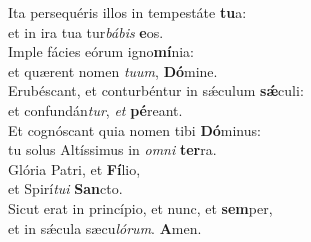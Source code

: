 \evenverse Ita persequéris illos in tempestáte \textbf{tu}a:~\*\\
\evenverse et in ira tua tur\textit{bá}\textit{bis} \textbf{e}os.\\
\oddverse Imple fácies eórum igno\textbf{mí}nia:~\*\\
\oddverse et quærent nomen \textit{tu}\textit{um}, \textbf{Dó}mine.\\
\evenverse Erubéscant, et conturbéntur in sǽculum \textbf{sǽ}culi:~\*\\
\evenverse et confundán\textit{tur}, \textit{et} \textbf{pé}reant.\\
\oddverse Et cognóscant quia nomen tibi \textbf{Dó}minus:~\*\\
\oddverse tu solus Altíssimus in \textit{om}\textit{ni} \textbf{ter}ra.\\
\evenverse Glória Patri, et \textbf{Fí}lio,~\*\\
\evenverse et Spirí\textit{tu}\textit{i} \textbf{San}cto.\\
\oddverse Sicut erat in princípio, et nunc, et \textbf{sem}per,~\*\\
\oddverse et in sǽcula sæcu\textit{ló}\textit{rum}. \textbf{A}men.\\
